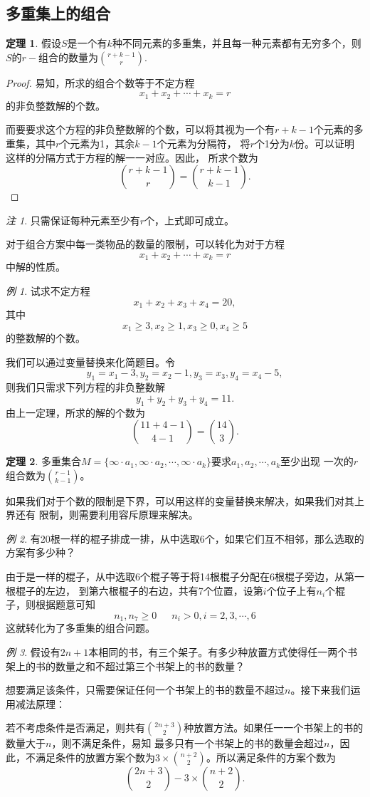 \documentclass[a4paper,11pt]{article}%
\theoremstyle{remark}
\newtheorem*{remark}{注}
\theoremstyle{remark}
\newtheorem*{example}{例}
\theoremstyle{definition}
\newtheorem{theorem}{定理}[section]
\theoremstyle{definition}
\theoremstyle{definition}
\begin{document}
\subsection{多重集上的组合}
\begin{theorem}
    假设$S$是一个有$k$种不同元素的多重集，并且每一种元素都有无穷多个，则$S$的$r-$组合的数量为$\binom{r+k-1}{r}$.
\end{theorem}
\begin{proof}
    易知，所求的组合个数等于不定方程
    \[x_1+x_2+\cdots+x_k=r\]
    的非负整数解的个数。

    而要要求这个方程的非负整数解的个数，可以将其视为一个有$r+k-1$个元素的多重集，其中$r$个元素为1，其余$k-1$个元素为分隔符，
    将$r$个1分为$k$份。可以证明这样的分隔方式于方程的解一一对应。因此，
    所求个数为
    \[\binom{r+k-1}{r}=\binom{r+k-1}{k-1}.\]
\end{proof}
\begin{remark}
    只需保证每种元素至少有$r$个，上式即可成立。
\end{remark}
对于组合方案中每一类物品的数量的限制，可以转化为对于方程
\[x_1+x_2+\cdots+x_k=r\]
中解的性质。
\begin{example}
    试求不定方程
    \[x_1+x_2+x_3+x_4=20,\]
    其中
    \[x_1\geq 3,x_2\geq 1,x_3\geq 0,x_4\geq 5\]
    的整数解的个数。 

    我们可以通过变量替换来化简题目。令
    \[y_1=x_1-3,y_2=x_2-1,y_3=x_3,y_4=x_4-5,\]
    则我们只需求下列方程的非负整数解
    \[y_1+y_2+y_3+y_4=11.\]
    由上一定理，所求的解的个数为
    \[\binom{11+4-1}{4-1}=\binom{14}{3}.\]
\end{example}
\begin{theorem}
    多重集合$M=\{\infty\cdot a_1,\infty\cdot a_2,\cdots,\infty\cdot a_k\}$要求$a_1,a_2,\cdots,a_k$至少出现
    一次的$r$组合数为$\binom{r-1}{k-1}$。
\end{theorem}
如果我们对于个数的限制是下界，可以用这样的变量替换来解决，如果我们对其上界还有
限制，则需要利用容斥原理来解决。
\begin{example}
    有20根一样的棍子排成一排，从中选取6个，如果它们互不相邻，那么选取的方案有多少种？

    由于是一样的棍子，从中选取6个棍子等于将14根棍子分配在6根棍子旁边，从第一根棍子的左边，
    到第六根棍子的右边，共有7个位置，设第$i$个位子上有$n_i$个棍子，则根据题意可知
    \[n_1,n_7\geq 0\phantom{111}n_i>0,i=2,3,\cdots,6\]
    这就转化为了多重集的组合问题。
\end{example}
\begin{example}
    假设有$2n+1$本相同的书，有三个架子。有多少种放置方式使得任一两个书架上的书的数量之和不超过第三个书架上的书的数量？

    想要满足该条件，只需要保证任何一个书架上的书的数量不超过$n$。接下来我们运用减法原理：

    若不考虑条件是否满足，则共有$\binom{2n+3}{2}$种放置方法。如果任一一个书架上的书的数量大于$n$，则不满足条件，易知
    最多只有一个书架上的书的数量会超过$n$，因此，不满足条件的放置方案个数为$3\times\binom{n+2}{2}$。所以满足条件的方案个数为
    \[\binom{2n+3}{2}-3\times \binom{n+2}{2}.\]
\end{example}
\end{document}
